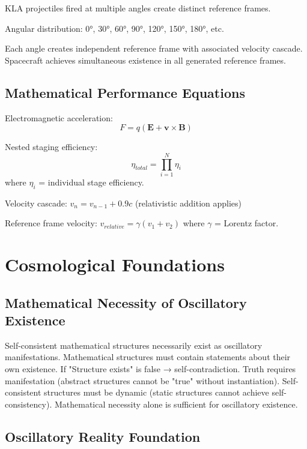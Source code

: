 \documentclass[12pt,a4paper]{article}
\begin{document}
KLA projectiles fired at multiple angles create distinct reference frames.

Angular distribution: 0°, 30°, 60°, 90°, 120°, 150°, 180°, etc.

Each angle creates independent reference frame with associated velocity cascade. Spacecraft achieves simultaneous existence in all generated reference frames.

\subsection{Mathematical Performance Equations}

Electromagnetic acceleration:
\begin{equation}
F = q(\mathbf{E} + \mathbf{v} \times \mathbf{B})
\end{equation}

Nested staging efficiency:
\begin{equation}
\eta_{total} = \prod_{i=1}^{N} \eta_i
\end{equation}
where $\eta_i$ = individual stage efficiency.

Velocity cascade: $v_n = v_{n-1} + 0.9c$ (relativistic addition applies)

Reference frame velocity: $v_{relative} = \gamma(v_1 + v_2)$ where $\gamma$ = Lorentz factor.

\section{Cosmological Foundations}

\subsection{Mathematical Necessity of Oscillatory Existence}

Self-consistent mathematical structures necessarily exist as oscillatory manifestations. Mathematical structures must contain statements about their own existence. If "Structure exists" is false → self-contradiction. Truth requires manifestation (abstract structures cannot be "true" without instantiation). Self-consistent structures must be dynamic (static structures cannot achieve self-consistency). Mathematical necessity alone is sufficient for oscillatory existence.

\subsection{Oscillatory Reality Foundation}
\end{document}
